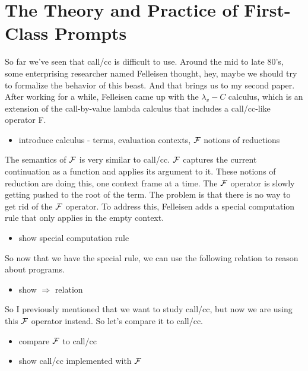 \documentclass[letterpaper]{llncs}
\begin{document}
\section*{The Theory and Practice of First-Class Prompts}%

So far we've seen that call/cc is difficult to use. Around the mid to late 80's, some enterprising researcher named Felleisen thought, hey, maybe we should try to formalize the behavior of this beast. And that brings us to my second paper. After working for a while, Felleisen came up with the $\lambda_v\!\!-\!\!C$ calculus, which is an extension of the call-by-value lambda calculus that includes a call/cc-like operator F. 

\begin{itemize}
	\item introduce calculus - terms, evaluation contexts, $ \mathcal{F} $ notions of reductions
\end{itemize}

The semantics of $ \mathcal{F} $ is very similar to call/cc. $ \mathcal{F} $ captures the current continuation as a function and applies its argument to it. These notions of reduction are doing this, one context frame at a time. The $ \mathcal{F} $ operator is slowly getting pushed to the root of the term. The problem is that there is no way to get rid of the $ \mathcal{F} $ operator. To address this, Felleisen adds a special computation rule that only applies in the empty context.

\begin{itemize}
	\item show special computation rule
\end{itemize}

So now that we have the special rule, we can use the following relation to reason about programs.

\begin{itemize}
	\item show $\Rightarrow$ relation
\end{itemize}

So I previously mentioned that we want to study call/cc, but now we are using this $ \mathcal{F} $ operator instead. So let's compare it to call/cc.

\begin{itemize}
	\item compare $ \mathcal{F} $ to call/cc
	\item show call/cc implemented with $ \mathcal{F} $
\end{itemize}
\end{document}
